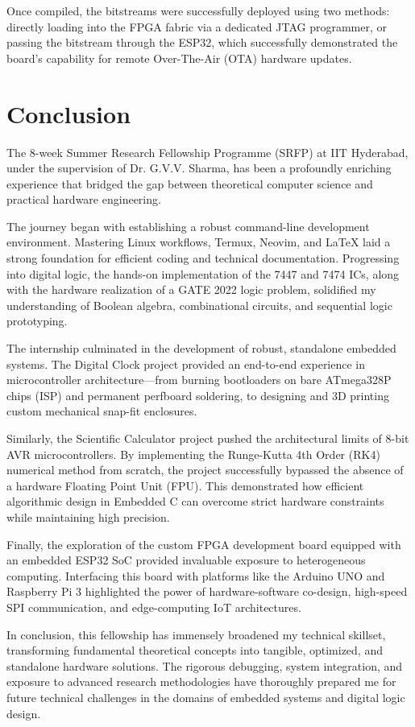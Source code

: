 \documentclass[12pt, a4paper]{report}
\begin{document}
Once compiled, the bitstreams were successfully deployed using two methods: directly loading into the FPGA fabric via a dedicated JTAG programmer, or passing the bitstream through the ESP32, which successfully demonstrated the board's capability for remote Over-The-Air (OTA) hardware updates.

\chapter{Conclusion}

The 8-week Summer Research Fellowship Programme (SRFP) at IIT Hyderabad, under the supervision of Dr. G.V.V. Sharma, has been a profoundly enriching experience that bridged the gap between theoretical computer science and practical hardware engineering. 

The journey began with establishing a robust command-line development environment. Mastering Linux workflows, Termux, Neovim, and LaTeX laid a strong foundation for efficient coding and technical documentation. Progressing into digital logic, the hands-on implementation of the 7447 and 7474 ICs, along with the hardware realization of a GATE 2022 logic problem, solidified my understanding of Boolean algebra, combinational circuits, and sequential logic prototyping.

The internship culminated in the development of robust, standalone embedded systems. The Digital Clock project provided an end-to-end experience in microcontroller architecture—from burning bootloaders on bare ATmega328P chips (ISP) and permanent perfboard soldering, to designing and 3D printing custom mechanical snap-fit enclosures. 

Similarly, the Scientific Calculator project pushed the architectural limits of 8-bit AVR microcontrollers. By implementing the Runge-Kutta 4th Order (RK4) numerical method from scratch, the project successfully bypassed the absence of a hardware Floating Point Unit (FPU). This demonstrated how efficient algorithmic design in Embedded C can overcome strict hardware constraints while maintaining high precision.

Finally, the exploration of the custom FPGA development board equipped with an embedded ESP32 SoC provided invaluable exposure to heterogeneous computing. Interfacing this board with platforms like the Arduino UNO and Raspberry Pi 3 highlighted the power of hardware-software co-design, high-speed SPI communication, and edge-computing IoT architectures.

In conclusion, this fellowship has immensely broadened my technical skillset, transforming fundamental theoretical concepts into tangible, optimized, and standalone hardware solutions. The rigorous debugging, system integration, and exposure to advanced research methodologies have thoroughly prepared me for future technical challenges in the domains of embedded systems and digital logic design.
\end{document}

